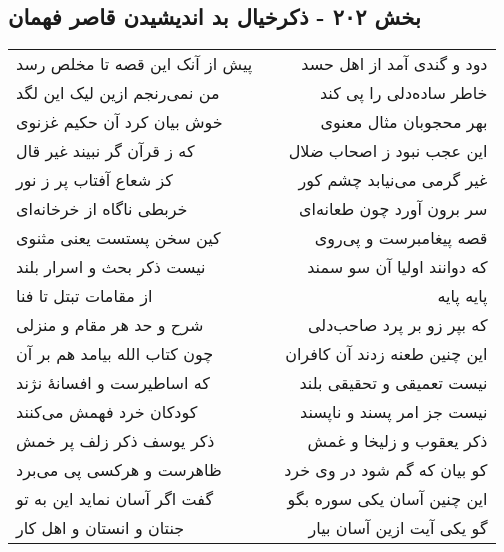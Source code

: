 \begin{center}
\section*{بخش ۲۰۲ - ذکرخیال بد اندیشیدن قاصر فهمان}
\label{sec:sh202}
\begin{longtable}{l p{0.5cm} r}
پیش از آنک این قصه تا مخلص رسد
&&
دود و گندی آمد از اهل حسد
\\
من نمی‌رنجم ازین لیک این لگد
&&
خاطر ساده‌دلی را پی کند
\\
خوش بیان کرد آن حکیم غزنوی
&&
بهر محجوبان مثال معنوی
\\
که ز قرآن گر نبیند غیر قال
&&
این عجب نبود ز اصحاب ضلال
\\
کز شعاع آفتاب پر ز نور
&&
غیر گرمی می‌نیابد چشم کور
\\
خربطی ناگاه از خرخانه‌ای
&&
سر برون آورد چون طعانه‌ای
\\
کین سخن پستست یعنی مثنوی
&&
قصه پیغامبرست و پی‌روی
\\
نیست ذکر بحث و اسرار بلند
&&
که دوانند اولیا آن سو سمند
\\
از مقامات تبتل تا فنا
&&
پایه پایه 
\\
شرح و حد هر مقام و منزلی
&&
که بپر زو بر پرد صاحب‌دلی
\\
چون کتاب الله بیامد هم بر آن
&&
این چنین طعنه زدند آن کافران
\\
که اساطیرست و افسانهٔ نژند
&&
نیست تعمیقی و تحقیقی بلند
\\
کودکان خرد فهمش می‌کنند
&&
نیست جز امر پسند و ناپسند
\\
ذکر یوسف ذکر زلف پر خمش
&&
ذکر یعقوب و زلیخا و غمش
\\
ظاهرست و هرکسی پی می‌برد
&&
کو بیان که گم شود در وی خرد
\\
گفت اگر آسان نماید این به تو
&&
این چنین آسان یکی سوره بگو
\\
جنتان و انستان و اهل کار
&&
گو یکی آیت ازین آسان بیار
\\
\end{longtable}
\end{center}
